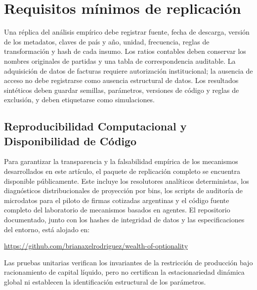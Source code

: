 \documentclass[11pt,a4paper]{article}
\begin{document}
\section{Requisitos mínimos de replicación}
Una réplica del análisis empírico debe registrar fuente, fecha de descarga, versión de los metadatos, claves de país y año, unidad, frecuencia, reglas de transformación y hash de cada insumo. Los ratios contables deben conservar los nombres originales de partidas y una tabla de correspondencia auditable. La adquisición de datos de facturas requiere autorización institucional; la ausencia de acceso no debe registrarse como ausencia estructural de datos. Los resultados sintéticos deben guardar semillas, parámetros, versiones de código y reglas de exclusión, y deben etiquetarse como simulaciones.
\subsection{Reproducibilidad Computacional y Disponibilidad de Código}
Para garantizar la transparencia y la falsabilidad empírica de los mecanismos desarrollados en este artículo, el paquete de replicación completo se encuentra disponible públicamente. Este incluye los resolutores analíticos deterministas, los diagnósticos distribucionales de proyección por bins, los scripts de auditoría de microdatos para el piloto de firmas cotizadas argentinas y el código fuente completo del laboratorio de mecanismos basados en agentes. El repositorio documentado, junto con los hashes de integridad de datos y las especificaciones del entorno, está alojado en:
\begin{center}
    \url{https://github.com/brianaxelrodriguez/wealth-of-optionality}
\end{center}
Las pruebas unitarias verifican los invariantes de la restricción de producción bajo racionamiento de capital líquido, pero no certifican la estacionariedad dinámica global ni establecen la identificación estructural de los parámetros.
\end{document}
